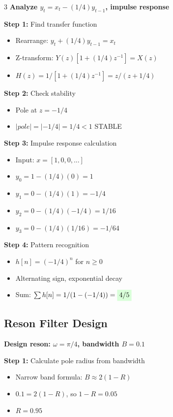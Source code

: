 \documentclass[10pt,landscape,a4paper]{article}
\newcommand{\problem}[1]{\textbf{\colorbox{cyan!15}{#1}}}
\newcommand{\answer}[1]{\colorbox{green!15}{#1}}
\begin{document}
\begin{multicols}{3}
\problem{Analyze $y_t = x_t - (1/4)y_{t-1}$, impulse response}

\textbf{Step 1:} Find transfer function
\begin{itemize}
\item Rearrange: $y_t + (1/4)y_{t-1} = x_t$
\item Z-transform: $Y(z)[1 + (1/4)z^{-1}] = X(z)$
\item $H(z) = 1/[1 + (1/4)z^{-1}] = z/(z + 1/4)$
\end{itemize}

\textbf{Step 2:} Check stability
\begin{itemize}
\item Pole at $z = -1/4$
\item $|pole| = |-1/4| = 1/4 < 1$ \answer{STABLE}
\end{itemize}

\textbf{Step 3:} Impulse response calculation
\begin{itemize}
\item Input: $x = [1, 0, 0, ...]$
\item $y_0 = 1 - (1/4)(0) = 1$
\item $y_1 = 0 - (1/4)(1) = -1/4$
\item $y_2 = 0 - (1/4)(-1/4) = 1/16$
\item $y_3 = 0 - (1/4)(1/16) = -1/64$
\end{itemize}

\textbf{Step 4:} Pattern recognition
\begin{itemize}
\item $h[n] = (-1/4)^n$ for $n \geq 0$
\item Alternating sign, exponential decay
\item Sum: $\sum h[n] = 1/(1-(-1/4)) = \answer{4/5}$
\end{itemize}

\subsection*{Reson Filter Design}

\problem{Design reson: $\omega = \pi/4$, bandwidth $B = 0.1$}

\textbf{Step 1:} Calculate pole radius from bandwidth
\begin{itemize}
\item Narrow band formula: $B \approx 2(1-R)$
\item $0.1 = 2(1-R)$, so $1-R = 0.05$
\item $R = 0.95$
\end{itemize}


\end{multicols}
\end{document}
